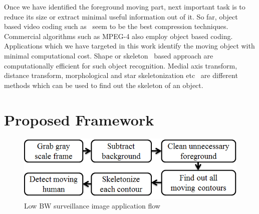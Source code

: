 \documentclass[conference]{IEEEtran}
\begin{document}
\indent Once we have identified the foreground moving part, next
important task is to reduce its size or extract minimal useful
information out of it. So far, object based video coding such
as~\cite{7, 8} seem to be the best compression techniques.  Commercial
algorithms such as MPEG-4 also employ object based coding.  Applications
which we have targeted in this work identify the moving object with
minimal computational cost. Shape or skeleton~\cite{11} based approach
are computationally efficient for such object recognition. Medial axis
transform, distance transform, morphological and star skeletonization
etc~\cite{9, 10} are different methods which can be used to find out
the skeleton of an object.\\


\section{Proposed Framework}

\begin{figure}[!h]
\centering
\includegraphics[scale=0.45]{figures/image_pipeline}
\caption{Low BW surveillance image application flow}
\label{image_pipeline}
\end{figure}
\end{document}
